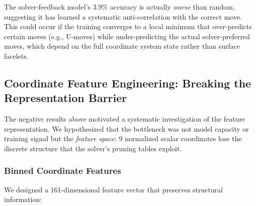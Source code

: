 \documentclass[conference]{IEEEtran}
\begin{document}
The solver-feedback model's 3.9\% accuracy is actually \emph{worse} than random, suggesting it has learned a systematic anti-correlation with the correct move. This could occur if the training converges to a local minimum that over-predicts certain moves (e.g., U-moves) while under-predicting the actual solver-preferred moves, which depend on the full coordinate system state rather than surface facelets.

\FloatBarrier
\subsection{Coordinate Feature Engineering: Breaking the Representation Barrier}
\label{sec:coord-features}

The negative results above motivated a systematic investigation of the feature representation. We hypothesized that the bottleneck was not model capacity or training signal but the \emph{feature space}: 9 normalized scalar coordinates lose the discrete structure that the solver's pruning tables exploit.

\subsubsection{Binned Coordinate Features}
We designed a 161-dimensional feature vector that preserves structural information:
\end{document}
